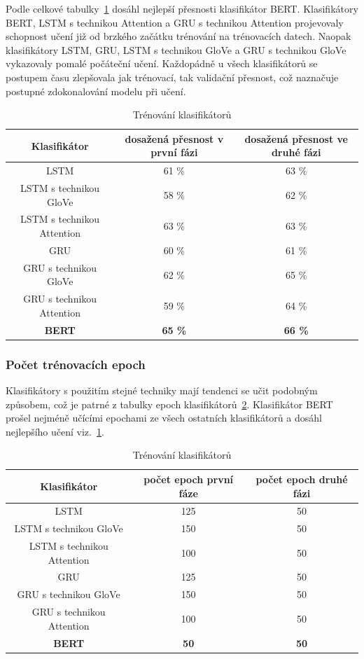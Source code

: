 Podle celkové tabulky~\ref{tab:EN trenovani klasifikatoru} dosáhl nejlepší přesnosti klasifikátor BERT.\@
Klasifikátory BERT, LSTM s technikou Attention a GRU s technikou Attention projevovaly schopnost učení již od brzkého začátku trénování na trénovacích datech.
Naopak klasifikátory LSTM, GRU, LSTM s technikou GloVe a GRU s technikou GloVe vykazovaly pomalé počáteční učení.
Každopádně u všech klasifikátorů se postupem času zlepšovala jak trénovací, tak validační přesnost, což naznačuje postupné zdokonalování modelu při učení.
\begin{table}[H]
	\centering
	\caption{Trénování klasifikátorů}\label{tab:EN trenovani klasifikatoru}
	\begin{tabular}{ c c c }
			\toprule
			Klasifikátor & dosažená přesnost v první fázi & dosažená přesnost ve druhé fázi\\
			\midrule
            LSTM & 61 \% & 63 \%\\
            LSTM s technikou GloVe & 58 \% & 62 \%\\
            LSTM s technikou Attention & 63 \% & 63 \%\\
            GRU & 60 \% & 61 \%\\
            GRU s technikou GloVe & 62 \% & 65 \%\\
            GRU s technikou Attention & 59 \% & 64 \%\\
            \textbf{BERT} & \textbf{65 \%} & \textbf{66 \%}\\
			\midrule
		\end{tabular}
\end{table}

\subsubsection{Počet trénovacích epoch}
Klasifikátory s použitím stejné techniky mají tendenci se učit podobným způsobem, což je patrné z tabulky epoch klasifikátorů~\ref{tab:EN pocet epoch}.
Klasifikátor BERT prošel nejméně učícími epochami ze všech ostatních klasifikátorů a dosáhl nejlepšího učení viz.~\ref{tab:EN trenovani klasifikatoru}.

\begin{table}[H]
	\centering
	\caption{Trénování klasifikátorů}\label{tab:EN pocet epoch}
	\begin{tabular}{ c c c }
			\toprule
			Klasifikátor & počet epoch první fáze & počet epoch druhé fázi\\
			\midrule
            LSTM & 125 & 50\\
            LSTM s technikou GloVe & 150 & 50\\
            LSTM s technikou Attention & 100 & 50\\
            GRU & 125 & 50\\
            GRU s technikou GloVe & 150 & 50\\
            GRU s technikou Attention & 100 & 50\\
            \textbf{BERT} & \textbf{50} & \textbf{50}\\
			\midrule
		\end{tabular}
\end{table}


